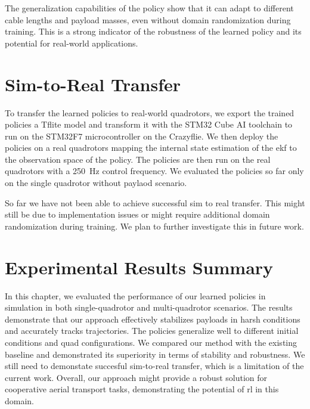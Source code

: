 The generalization capabilities of the policy show that it can adapt to different cable lengths and payload masses, even without domain randomization during training. This is a strong indicator of the robustness of the learned policy and its potential for real-world applications.

\section{Sim-to-Real Transfer}
To transfer the learned policies to real-world quadrotors, we export the trained policies a Tflite model and transform it with the STM32 Cube AI toolchain to run on the STM32F7 microcontroller on the Crazyflie. We then deploy the policies on a real quadrotors mapping the internal state estimation of the \gls{ekf} to the observation space of the policy. The policies are then run on the real quadrotors with a 250~Hz control frequency. We evaluated the policies so far only on the single quadrotor without paylaod scenario. 

So far we have not been able to achieve successful sim to real transfer. This might still be due to implementation issues or might require additional domain randomization during training. We plan to further investigate this in future work.
\section{Experimental Results Summary}
In this chapter, we evaluated the performance of our learned policies in simulation in both single-quadrotor and multi-quadrotor scenarios. The results demonstrate that our approach effectively stabilizes payloads in harsh conditions and accurately tracks trajectories. The policies generalize well to different initial conditions and quad configurations. We compared our method with the existing baseline and demonstrated its superiority in terms of stability and robustness. We still need to demonstate succesful sim-to-real transfer, which is a limitation of the current work. Overall, our approach might provide a robust solution for cooperative aerial transport tasks, demonstrating the potential of \gls{rl} in this domain.